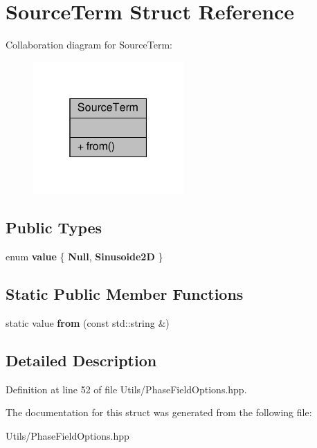 \hypertarget{structSourceTerm}{}\section{Source\+Term Struct Reference}
\label{structSourceTerm}


Collaboration diagram for Source\+Term\+:\nopagebreak
\begin{figure}[H]
\begin{center}
\leavevmode
\includegraphics[width=163pt]{structSourceTerm__coll__graph}
\end{center}
\end{figure}
\subsection*{Public Types}
\begin{DoxyCompactItemize}
\item 
\mbox{\label{structSourceTerm_a1080555d9f8b64fabe698711ad1021ca}} 
enum {\bfseries value} \{ {\bfseries Null}, 
{\bfseries Sinusoide2D}
 \}
\end{DoxyCompactItemize}
\subsection*{Static Public Member Functions}
\begin{DoxyCompactItemize}
\item 
\mbox{\label{structSourceTerm_a164056716e3b72f8980fcb2c1be65cfa}} 
static value {\bfseries from} (const std\+::string \&)
\end{DoxyCompactItemize}


\subsection{Detailed Description}


Definition at line 52 of file Utils/\+Phase\+Field\+Options.\+hpp.



The documentation for this struct was generated from the following file\+:\begin{DoxyCompactItemize}
\item 
Utils/\+Phase\+Field\+Options.\+hpp\end{DoxyCompactItemize}
